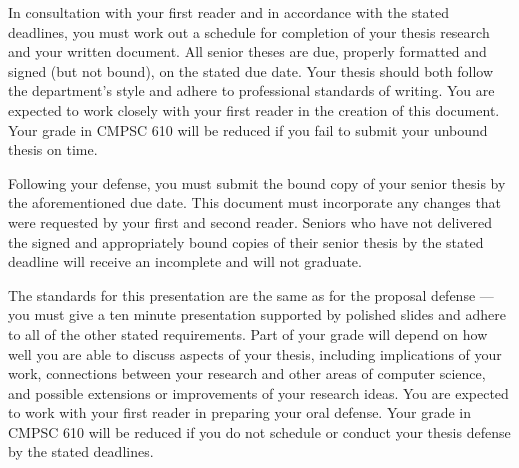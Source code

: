 \medskip
{} In consultation with your first reader and in accordance with the stated deadlines, you
must work out a schedule for completion of your thesis research and your written document. All senior theses are due,
properly formatted and signed (but not bound), on the stated due date. 	Your thesis should both follow the department's
style and adhere to professional standards of writing. You are expected to work closely with your first reader in the
creation of this document.  Your grade in CMPSC 610 will be reduced if you fail to submit your unbound thesis on time.

Following your defense, you must submit the bound copy of your senior thesis by the aforementioned due date.  This
document must incorporate any changes that were requested by your first and second reader. Seniors who have not
delivered the signed and appropriately bound copies of their senior thesis by the stated deadline will receive an
incomplete and will not graduate.

\medskip
{} The standards for this presentation are the same as for the proposal defense ---  you
must give a ten minute presentation supported by polished slides and adhere to all of the other stated requirements.
Part of your grade will depend on how well you are able to discuss aspects of your thesis, including implications of
your work, connections between your research and other areas of computer science, and possible extensions or
improvements of your research ideas.  You are expected to work with your first reader in preparing your oral defense.
Your grade in CMPSC 610 will be reduced if you do not schedule or conduct your thesis defense by the stated deadlines.

%


